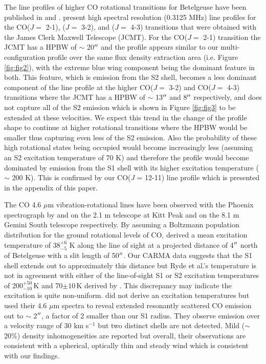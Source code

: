 \documentclass[iop]{emulateapj}
\begin{document}
The line profiles of higher CO rotational transitions for Betelgeuse have been published in \cite{2003A&A...407..609K} and \cite{2010A&A...523A..18D}. \cite{2010A&A...523A..18D} present high spectral resolution (0.3125 MHz) line profiles for the CO($J=$ 2-1), ($J=$ 3-2), and ($J=$ 4-3) transitions that were obtained with the James Clerk Maxwell Telescope (JCMT). For the CO($J=$ 2-1) transition the JCMT has a HPBW of $\sim$ 20$\mbox{$^{\prime\prime}$}$ and the profile appears similar to our multi-configuration profile over the same flux density extraction area (i.e. Figure \ref{fig:fig2}), with the extreme blue wing component being the dominant feature in both. This feature, which is emission from the S2 shell, becomes a less dominant component of the line profile at the higher CO($J=$ 3-2) and CO($J=$ 4-3) transitions where the JCMT has a HPBW of $\sim$ 13$\mbox{$^{\prime\prime}$}$ and 8$\mbox{$^{\prime\prime}$}$ respectively, and does not capture all of the S2 emission which is shown in Figure \ref{fig:fig3} to be extended at these velocities. We expect this trend in the change of the profile shape to continue at higher rotational transitions where the HPBW would be smaller thus capturing even less of the S2 emission. Also the probability of these high rotational states being occupied would become increasingly less (assuming an S2 excitation temperature of 70 K) and therefore the profile would become dominated by emission from the S1 shell with its higher excitation temperature ($\sim$ 200 K). This is confirmed by our CO(\textit{J} = 12-11) line profile which is presented in the appendix of this paper.

The CO 4.6 $\mu$m vibration-rotational lines have been observed with the Phoenix spectrograph \citep{1998SPIE.3354..810H} by \cite{1999A&A...347L..35R} and \cite{2009AJ....137.3558S} on the 2.1 m telescope at Kitt Peak and on the 8.1 m Gemini South telescope respectively. By assuming a Boltzmann population distribution for the ground rotational levels of CO, \cite{1999A&A...347L..35R}  derived a mean excitation temperature of 38${}^{+6}_{-5}$ K along the line of sight at a projected distance of 4$\mbox{$^{\prime\prime}$}$ north of Betelgeuse with a slit length of 50$\mbox{$^{\prime\prime}$}$. Our CARMA data suggests that the S1 shell extends out to approximately this distance but Ryde et al.'s temperature is not in agreement with either of the line-of-sight S1 or S2 excitation temperatures of 200${}^{+50}_{-10}$\,K and 70$\pm 10$\,K derived by \cite{1979ApJ...233L.135B}. This discrepancy may indicate the excitation is quite non-uniform.
\cite{2009AJ....137.3558S} did not derive an excitation temperatures but used their 4.6 $\mu$m spectra to reveal extended resonantly scattered CO emission out to $\sim$ 2$\mbox{$^{\prime\prime}$}$, a factor of 2 smaller than our S1 radius. They observe emission over a velocity range of 30 km s${}^{-1}$ but two distinct shells are not detected. Mild ($\sim$ 20\%) density inhomogeneities are reported but overall, their observations are consistent with a spherical, optically thin and steady wind which is consistent with our findings.
\end{document}
